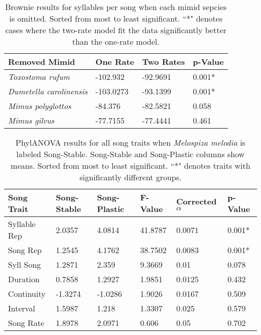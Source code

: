 \documentclass[a4paper,12pt]{article}
\begin{document}
\begin{table}[ht]
\caption{Brownie results for syllables per song when each mimid sepcies is omitted.  Sorted from most to least significant.  ``*" denotes cases where the two-rate model fit the data significantly better than the one-rate model.}
\centering
\begin{tabular}{llll}
  \hline
Removed Mimid & One Rate & Two Rates & p-Value \\ 
  \hline
\textit{Toxostoma rufum} & -102.932 & -92.9691 & 0.001* \\ 
  \textit{Dumetella carolinensis} & -103.0273 & -93.1399 & 0.001* \\ 
  \textit{Mimus polyglottos} & -84.376 & -82.5821 & 0.058 \\ 
  \textit{Mimus gilvus} & -77.7155 & -77.4441 & 0.461 \\ 
   \hline
\end{tabular}
\end{table}



\begin{table}[ht]
\caption{PhylANOVA results for all song traits when \textit{Melospiza melodia} is labeled Song-Stable.  Song-Stable and Song-Plastic columns show means.  Sorted from most to least significant.  ``*" denotes traits with significantly different groups.}
\centering
\begin{tabular}{llllll}
  \hline
Song Trait & Song-Stable & Song-Plastic & F-Value & Corrected $\alpha$ & p-Value \\ 
  \hline
Syllable Rep & 2.0357 & 4.0814 & 41.8787 & 0.0071 & 0.001* \\ 
  Song Rep & 1.2545 & 4.1762 & 38.7502 & 0.0083 & 0.001* \\ 
  Syll Song & 1.2871 & 2.359 & 9.3669 & 0.01 & 0.078 \\ 
  Duration & 0.7858 & 1.2927 & 1.9851 & 0.0125 & 0.432 \\ 
  Continuity & -1.3274 & -1.0286 & 1.9026 & 0.0167 & 0.509 \\ 
  Interval & 1.5987 & 1.218 & 1.3307 & 0.025 & 0.579 \\ 
  Song Rate & 1.8978 & 2.0971 & 0.606 & 0.05 & 0.702 \\ 
   \hline
\end{tabular}
\end{table}
\end{document}
